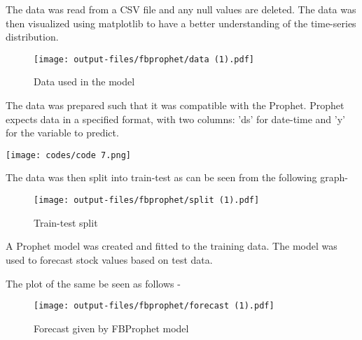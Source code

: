 \documentclass[12pt]{article}
\begin{document}
The data was read from a CSV file and any null values are deleted. The data was then visualized using matplotlib to have a better understanding of the time-series distribution. 
\begin{figure}[H]
    \centering
    \texttt{[image: output-files/fbprophet/data (1).pdf]}
    \caption{Data used in the model}
    \label{fig:enter-label}
\end{figure}
The data was prepared such that it was compatible with the Prophet. Prophet expects data in a specified format, with two columns: 'ds' for date-time and 'y' for the variable to predict.
\vspace{-0.2in}
\begin{center}
    \texttt{[image: codes/code 7.png]}
\end{center}
\noindent The data was then split into train-test as can be seen from the following graph-
\begin{figure}[H]
    \centering
    \texttt{[image: output-files/fbprophet/split (1).pdf]}
    \caption{Train-test split}
    \label{fig:enter-label}
\end{figure}

A Prophet model was created and fitted to the training data. The model was used to forecast stock values based on test data.

\noindent The plot of the same be seen as follows - 
\vspace{-.1in}
\begin{figure}[H]
    \centering
    \texttt{[image: output-files/fbprophet/forecast (1).pdf]}
    \caption{Forecast given by FBProphet model}
    \label{fig:enter-label}
\end{figure}
\end{document}
